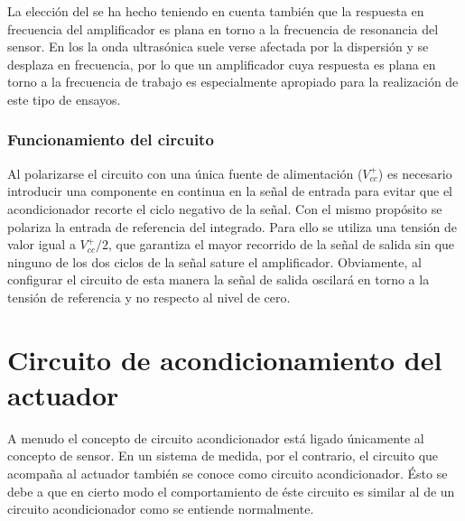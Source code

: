 La elección del  se ha hecho teniendo en cuenta también que la
respuesta en frecuencia del amplificador es plana en torno a la frecuencia
de resonancia del sensor. En los  la onda ultrasónica suele
verse afectada por la dispersión y se desplaza en frecuencia, por lo que un
amplificador cuya respuesta es plana en torno a la frecuencia de trabajo es
especialmente apropiado para la realización de este tipo de ensayos.


\subsubsection{Funcionamiento del circuito}

Al polarizarse el circuito con una única fuente de alimentación
($V^+_{cc}$) es necesario introducir una componente en continua en la señal
de entrada para evitar que el acondicionador recorte el ciclo negativo de
la señal. Con el mismo propósito se polariza la entrada de referencia del
integrado. Para ello se utiliza una tensión de valor igual a $V^+_{cc}/2$,
que garantiza el mayor recorrido de la señal de salida sin que ninguno de
los dos ciclos de la señal sature el amplificador. Obviamente, al
configurar el circuito de esta manera la señal de salida oscilará en torno
a la tensión de referencia y no respecto al nivel de cero.


\section{Circuito de acondicionamiento del actuador}

\sshortpage{}

A menudo el concepto de circuito acondicionador está ligado únicamente al
concepto de sensor. En un sistema de medida, por el contrario, el circuito
que acompaña al actuador también se conoce como circuito acondicionador.
Ésto se debe a que en cierto modo el comportamiento de éste circuito es
similar al de un circuito acondicionador como se entiende normalmente.

